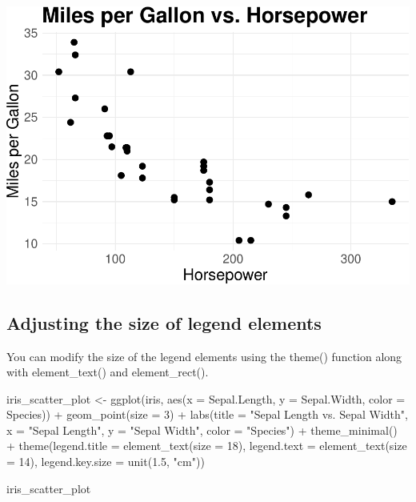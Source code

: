 \documentclass[
]{book}
\newenvironment{Shaded}{\begin{snugshade}}{\end{snugshade}}
\newcommand{\AttributeTok}[1]{\textcolor[rgb]{0.77,0.63,0.00}{#1}}
\newcommand{\DecValTok}[1]{\textcolor[rgb]{0.00,0.00,0.81}{#1}}
\newcommand{\FloatTok}[1]{\textcolor[rgb]{0.00,0.00,0.81}{#1}}
\newcommand{\FunctionTok}[1]{\textcolor[rgb]{0.00,0.00,0.00}{#1}}
\newcommand{\NormalTok}[1]{#1}
\newcommand{\OtherTok}[1]{\textcolor[rgb]{0.56,0.35,0.01}{#1}}
\newcommand{\SpecialCharTok}[1]{\textcolor[rgb]{0.00,0.00,0.00}{#1}}
\newcommand{\StringTok}[1]{\textcolor[rgb]{0.31,0.60,0.02}{#1}}
\begin{document}
\includegraphics[width=1\linewidth]{graphformatting_files/figure-latex/unnamed-chunk-10-1}

\hypertarget{adjusting-the-size-of-legend-elements}{%
\subsection{Adjusting the size of legend elements}\label{adjusting-the-size-of-legend-elements}}

You can modify the size of the legend elements using the theme() function along with element\_text() and element\_rect().

\begin{Shaded}
\begin{Highlighting}[]
\NormalTok{iris\_scatter\_plot }\OtherTok{\textless{}{-}} \FunctionTok{ggplot}\NormalTok{(iris, }\FunctionTok{aes}\NormalTok{(}\AttributeTok{x =}\NormalTok{ Sepal.Length, }\AttributeTok{y =}\NormalTok{ Sepal.Width, }\AttributeTok{color =}\NormalTok{ Species)) }\SpecialCharTok{+}
  \FunctionTok{geom\_point}\NormalTok{(}\AttributeTok{size =} \DecValTok{3}\NormalTok{) }\SpecialCharTok{+}
  \FunctionTok{labs}\NormalTok{(}\AttributeTok{title =} \StringTok{"Sepal Length vs. Sepal Width"}\NormalTok{,}
       \AttributeTok{x =} \StringTok{"Sepal Length"}\NormalTok{,}
       \AttributeTok{y =} \StringTok{"Sepal Width"}\NormalTok{,}
       \AttributeTok{color =} \StringTok{"Species"}\NormalTok{) }\SpecialCharTok{+}
  \FunctionTok{theme\_minimal}\NormalTok{() }\SpecialCharTok{+}
  \FunctionTok{theme}\NormalTok{(}\AttributeTok{legend.title =} \FunctionTok{element\_text}\NormalTok{(}\AttributeTok{size =} \DecValTok{18}\NormalTok{),}
        \AttributeTok{legend.text =} \FunctionTok{element\_text}\NormalTok{(}\AttributeTok{size =} \DecValTok{14}\NormalTok{),}
        \AttributeTok{legend.key.size =} \FunctionTok{unit}\NormalTok{(}\FloatTok{1.5}\NormalTok{, }\StringTok{"cm"}\NormalTok{))}

\NormalTok{iris\_scatter\_plot}
\end{Highlighting}
\end{Shaded}
\end{document}
